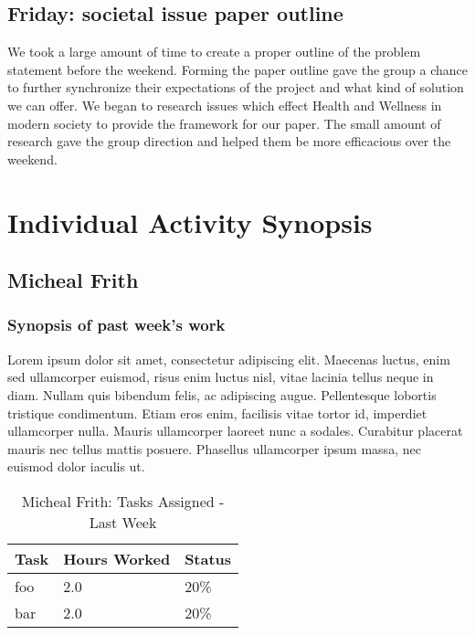 \documentclass[12pt,article,compsoc]{IEEEtran}
\begin{document}
	\subsection{Friday: societal issue paper outline}
		We took a large amount of time to create a proper outline of the problem statement before the weekend. 
		Forming the paper outline gave the group a chance to further synchronize their expectations of the project 
		and what kind of solution we can offer. We began to research issues which effect Health and Wellness in 
		modern society to provide the framework for our paper. The small amount of research gave the group direction 
		and helped them be more efficacious over the weekend. 
		\clearpage


\section{Individual Activity Synopsis}
	\subsection{Micheal Frith}

	\subsubsection*{Synopsis of past week's work}

	Lorem ipsum dolor sit amet, consectetur adipiscing elit. Maecenas luctus, enim sed ullamcorper euismod, risus enim luctus nisl, vitae lacinia tellus neque in diam. Nullam quis bibendum felis, ac adipiscing augue. Pellentesque lobortis tristique condimentum. Etiam eros enim, facilisis vitae tortor id, imperdiet ullamcorper nulla. Mauris ullamcorper laoreet nunc a sodales. Curabitur placerat mauris nec tellus mattis posuere. Phasellus ullamcorper ipsum massa, nec euismod dolor iaculis ut.


	\begin{table}[ht]
	\renewcommand{\arraystretch}{1.3}
		\caption{Micheal Frith: Tasks Assigned - Last Week}
		
		\label{Summary of Micheal Frith's activities: this week}
		
		\centering
		\begin{tabular}{p{5.5cm}|p{1cm}|p{1cm}} 
		\hline
		\bfseries 	Task		 		& \bfseries Hours Worked	& \bfseries Status	\\
		\hline\hline	
					foo					& 2.0						& 20\%				\\	%
					bar					& 2.0						& 20\%				\\	
		\hline
		\end{tabular}
	\end{table}
\end{document}
